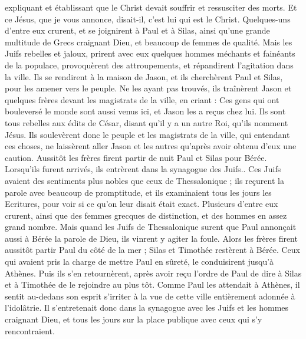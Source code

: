 \begin{multicols}{2}
{{expliquant et établissant que le Christ devait souffrir et ressusciter des morts. Et ce Jésus, que je vous annonce, disait-il, c'est lui qui est le Christ.
Quelques-uns d'entre eux crurent, et se joignirent à Paul et à Silas, ainsi qu'une grande multitude de Grecs craignant Dieu, et beaucoup de femmes de qualité.
Mais les Juifs rebelles et jaloux, prirent avec eux quelques hommes méchants et fainéants de la populace, provoquèrent des attroupements, et répandirent l'agitation dans la ville. Ils se rendirent à la maison de Jason, et ils cherchèrent Paul et Silas, pour les amener vers le peuple.
Ne les ayant pas trouvés, ils traînèrent Jason et quelques frères devant les magistrats de la ville, en criant : Ces gens qui ont bouleversé le monde sont aussi venus ici, et Jason les a reçus chez lui.
Ils sont tous rebelles aux édits de César, disant qu'il y a un autre Roi, qu'ils nomment Jésus.
Ils soulevèrent donc le peuple et les magistrats de la ville, qui entendant ces choses,
ne laissèrent aller Jason et les autres qu'après avoir obtenu d'eux une caution. 
Aussitôt les frères firent partir de nuit Paul et Silas pour Bérée. Lorsqu'ils furent arrivés, ils entrèrent dans la synagogue des Juifs..
Ces Juifs avaient des sentiments plus nobles que ceux de Thessalonique ; ils reçurent la parole avec beaucoup de promptitude, et ils examinaient tous les jours les Ecritures, pour voir si ce qu'on leur disait était exact.
Plusieurs d'entre eux crurent, ainsi que des femmes grecques de distinction, et des hommes en assez grand nombre.
Mais quand les Juifs de Thessalonique surent que Paul annonçait aussi à Bérée la parole de Dieu, ils vinrent y agiter la foule.
Alors les frères firent aussitôt partir Paul du côté de la mer ; Silas et Timothée restèrent à Bérée.
Ceux qui avaient pris la charge de mettre Paul en sûreté, le conduisirent jusqu'à Athènes. Puis ils s'en retournèrent, après avoir reçu l'ordre de Paul de dire à Silas et à Timothée de le rejoindre au plus tôt.
Comme Paul les attendait à Athènes, il sentit au-dedans son esprit s'irriter à la vue de cette ville entièrement adonnée à l'idolâtrie.
Il s'entretenait donc dans la synagogue avec les Juifs et les hommes craignant Dieu, et tous les jours sur la place publique avec ceux qui s'y rencontraient.
}}
\end{multicols}
